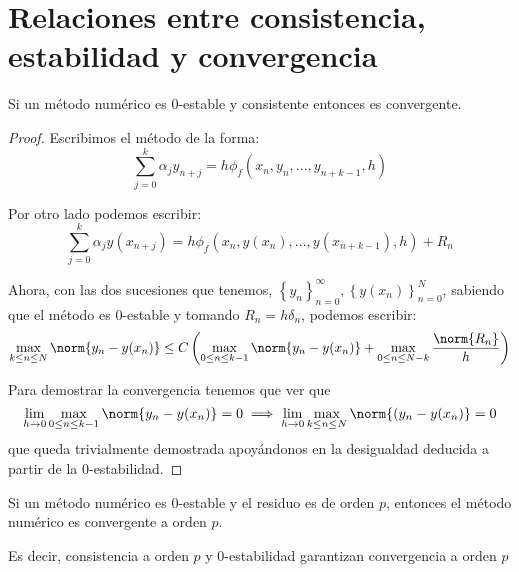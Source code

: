 \documentclass{apuntes}
\begin{document}
\section{Relaciones entre consistencia, estabilidad y convergencia}
\begin{theorem}\label{theorem:consist_y_0estable_converge}
Si un método numérico es 0-estable y consistente entonces es convergente.
\end{theorem}
\begin{proof}
Escribimos el método de la forma:
\[\sum_{j=0}^kα_jy_{n+j} = h \phi_f(x_n,y_n,...,y_{n+k-1},h)\]

Por otro lado podemos escribir:
\[\sum_{j=0}^kα_jy(x_{n+j}) = h \phi_f(x_n,y(x_n),...,y(x_{n+k-1}),h) + R_n\]

Ahora, con las dos sucesiones que tenemos, $\left\{y_n\right\}_{n=0}^∞, \left\{y(x_n)\right\}_{n=0}^N$, sabiendo que el método es 0-estable y tomando $R_n=hδ_n$, podemos escribir:
\[\max_{k\leq n \leq N}\norm{y_n-y(x_n)} \leq C\left( \max_{0 \leq n \leq k-1} \norm{y_n-y(x_n)} + \max_{0 \leq n \leq N-k} \frac{\norm{R_n}}{h}\right)\]

Para demostrar la convergencia tenemos que ver que 
\[\lim_{h \to 0} \max_{0 \leq n \leq k-1} \norm{y_n-y(x_n)}= 0 \implies \lim_{h\to 0} \max_{k\leq n \leq N}\norm{(y_n-y(x_n)}=0 \]
que queda trivialmente demostrada apoyándonos en la desigualdad deducida a partir de la 0-estabilidad.
\end{proof}

\begin{theorem}
Si un método numérico es 0-estable y el residuo es de orden $p$, entonces el método numérico es convergente a orden $p$.

Es decir, consistencia a orden $p$ y 0-estabilidad garantizan convergencia a orden $p$
\end{theorem}
\end{document}
